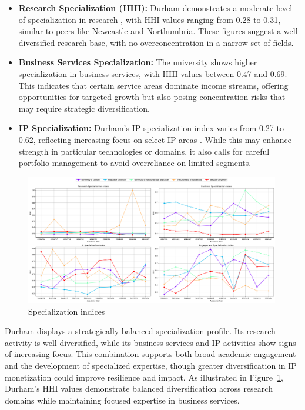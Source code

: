 \documentclass[journal,onecolumn, 10pt,draftclsnofoot]{IEEEtran}
\begin{document}
\begin{itemize}
    \item \textbf{Research Specialization (HHI):} Durham demonstrates a moderate level of specialization in research \cite{porter1985competitive}, with HHI values ranging from 0.28 to 0.31, similar to peers like Newcastle and Northumbria. These figures suggest a well-diversified research base, with no overconcentration in a narrow set of fields.

\item \textbf{Business Services Specialization:} The university shows higher specialization in business services, with HHI values between 0.47 and 0.69. This indicates that certain service areas dominate income streams, offering opportunities for targeted growth but also posing concentration risks that may require strategic diversification.

\item \textbf{IP Specialization:} Durham's IP specialization index varies from 0.27 to 0.62, reflecting increasing focus on select IP areas \cite{teece1986profiting}. While this may enhance strength in particular technologies or domains, it also calls for careful portfolio management to avoid overreliance on limited segments.
\end{itemize}



\begin{figure}[h]
\centering
\includegraphics[width=0.99\textwidth]{Fig/figure37.specialization_indices.png}
\caption{Specialization indices}
\label{fig:specialization-indices}
\end{figure}

Durham displays a strategically balanced specialization profile. Its research activity is well diversified, while its business services and IP activities show signs of increasing focus. This combination supports both broad academic engagement and the development of specialized expertise, though greater diversification in IP monetization could improve resilience and impact. As illustrated in Figure~\ref{fig:specialization-indices}, Durham's HHI values demonstrate balanced diversification across research domains while maintaining focused expertise in business services.
\end{document}
